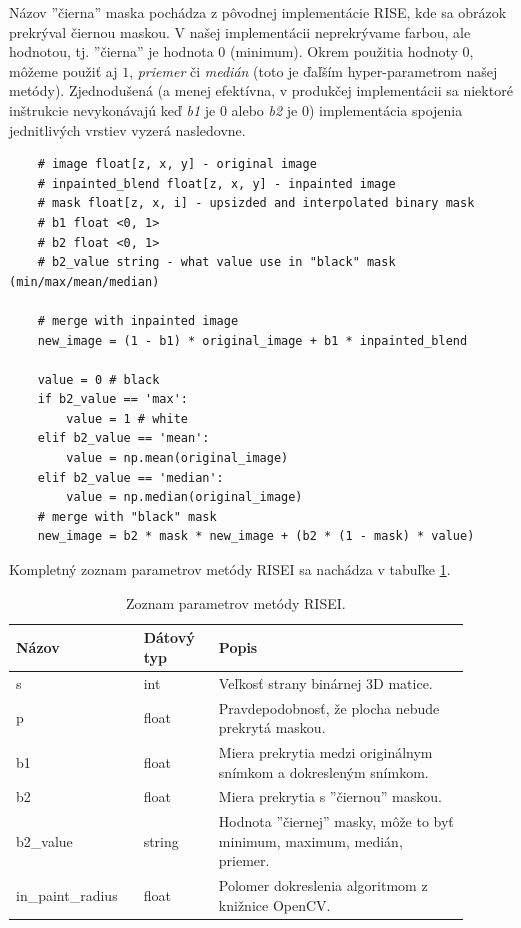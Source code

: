 Názov ''čierna'' maska pochádza z pôvodnej implementácie RISE, kde sa obrázok prekrýval čiernou maskou. V našej implementácii neprekrývame farbou, ale hodnotou, tj. ''čierna'' je hodnota $0$ (minimum). Okrem použitia hodnoty $0$, môžeme použiť aj $1$, \textit{priemer} či \textit{medián} (toto je ďaľším hyper-parametrom našej metódy). Zjednodušená (a menej efektívna, v produkčej implementácii sa niektoré inštrukcie nevykonávajú keď \textit{b1} je 0 alebo \textit{b2} je 0) implementácia spojenia jednitlivých vrstiev vyzerá nasledovne.

\begin{lstlisting}
    # image float[z, x, y] - original image
    # inpainted_blend float[z, x, y] - inpainted image
    # mask float[z, x, i] - upsizded and interpolated binary mask
    # b1 float <0, 1>
    # b2 float <0, 1>
    # b2_value string - what value use in "black" mask (min/max/mean/median)

    # merge with inpainted image
    new_image = (1 - b1) * original_image + b1 * inpainted_blend

    value = 0 # black
    if b2_value == 'max':
        value = 1 # white
    elif b2_value == 'mean':
        value = np.mean(original_image)
    elif b2_value == 'median':
        value = np.median(original_image)
    # merge with "black" mask
    new_image = b2 * mask * new_image + (b2 * (1 - mask) * value)
\end{lstlisting}

Kompletný zoznam parametrov metódy RISEI sa nachádza v tabuľke \ref{tab:rise_params}.

\begin{table}[]
    \begin{tabular}{p{0.25\linewidth} | p{0.15\linewidth} | p{0.5\linewidth}}
        \hline
        Názov             & Dátový typ & Popis                                                               \\ \hline
        s                 & int        & Veľkosť strany binárnej 3D matice.                                        \\
        p                 & float      & Pravdepodobnosť, že plocha nebude prekrytá maskou.                        \\
        b1                & float      & Miera prekrytia medzi originálnym snímkom a dokresleným snímkom.          \\
        b2                & float      & Miera prekrytia s ''čiernou'' maskou.                                     \\
        b2\_value         & string     & Hodnota ''čiernej'' masky, môže to byť minimum, maximum, medián, priemer. \\
        in\_paint\_radius & float      & Polomer dokreslenia algoritmom z knižnice OpenCV.                         \\ \hline
        \end{tabular}
    \caption{Zoznam parametrov metódy RISEI.}
    \label{tab:rise_params}
\end{table}

